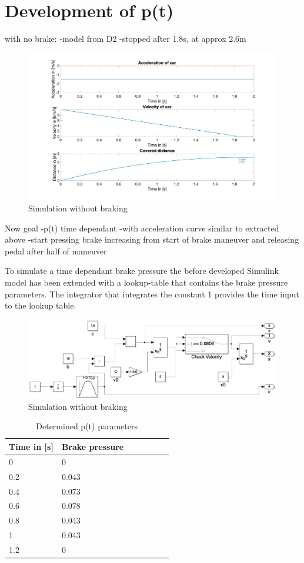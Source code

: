 \section{Development of p(t)}
with no brake:
-model from D2
-stopped after 1.8s, at approx 2.6m
\begin{figure}[H]
\centering
\includegraphics[width=1\textwidth]{images/D3_no_brake.jpg}
\caption{Simulation without braking}
\label{fig:D3_IndividualBraking2}
\end{figure}

Now goal
-p(t) time dependant
-with acceleration curve similar to extracted above
-start pressing brake increasing from start of brake maneuver and releasing pedal after half of maneuver

To simulate a time dependant brake pressure the before developed Simulink model has been extended with a lookup-table that contains the brake pressure parameters. The integrator that integrates the constant 1 provides the time input to the lookup table.
\begin{figure}[H]
\centering
\includegraphics[width=1\textwidth]{images/D3_model_extension.png}
\caption{Simulation without braking}
\label{fig:D3_IndividualBraking2}
\end{figure}

\begin{table}[H]
\centering
\caption{Determined p(t) parameters}
\renewcommand{\arraystretch}{1}
\begin{tabular}{lllllll}
\textbf{Time in [s]} & \textbf{Brake pressure}\\\hline
0 & 0\\
0.2  & 0.043\\
0.4  & 0.073\\
0.6  & 0.078\\
0.8  & 0.043\\
1  & 0.043\\
1.2  & 0\\
\end{tabular}
\end{table}

